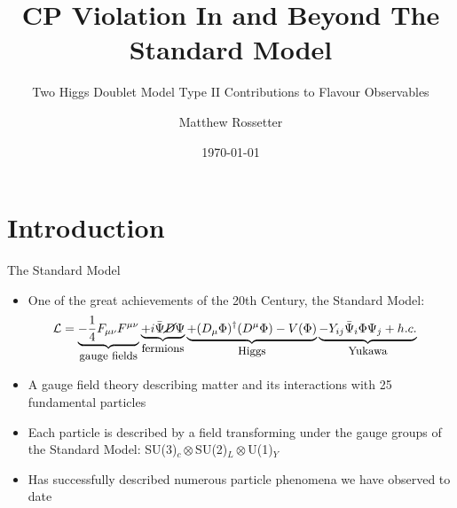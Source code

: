 \documentclass[10pt,xcolor={table,dvipsnames},t]{beamer}
\title{CP Violation In and Beyond The Standard Model}
\subtitle{Two Higgs Doublet Model Type II Contributions to Flavour Observables}
\author{Matthew Rossetter}
\institute{}
\date{\today}
\begin{document}
\section{Introduction}
\begin{frame}
  \titlepage
\end{frame}

\begin{frame}{The Standard Model}
    \begin{itemize}
        \item One of the great achievements of the 20th Century, the Standard Model:
            \begin{align*}
                \mathcal{L} &= \underbrace{-\frac14 F_{\mu\nu}F^{\mu\nu}}_{\text{\small gauge fields}} \underbrace{+ i\bar{\Psi}\cancel{D}\Psi}_{\text{\small fermions}} \underbrace{+ (D_\mu\Phi)^\dagger(D^\mu\Phi) - V(\Phi)}_{\text{\small Higgs}} \underbrace{- Y_{ij}\bar{\Psi}_i\Phi\Psi_j + h.c.}_{\text{\small Yukawa}}
            \end{align*}
        \item A gauge field theory describing matter and its interactions with 25 fundamental particles
        \item Each particle is described by a field transforming under the gauge groups of the Standard Model: SU(3)$_c\otimes$SU(2)$_L\otimes$U(1)$_Y$
        \item Has successfully described numerous particle phenomena we have observed to date
    \end{itemize}
\end{frame}
\end{document}
